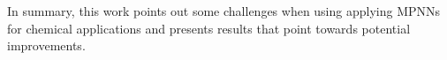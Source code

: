In summary, this work points out some challenges when using applying MPNNs for chemical applications and presents results that point towards potential improvements. 


\clearpage


\tableofcontents


\clearpage

